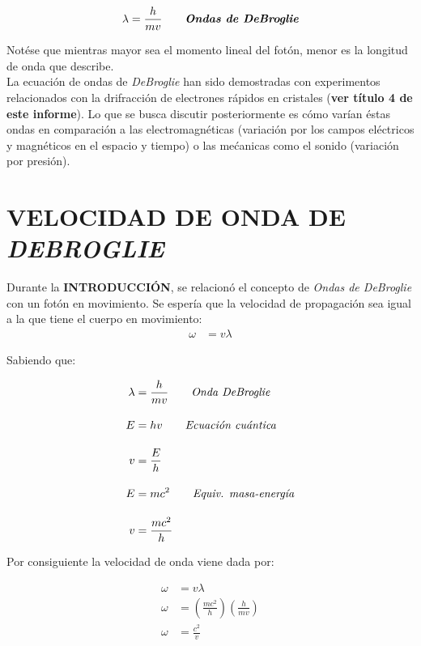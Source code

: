 \documentclass[a4paper]{article}
\begin{document}
        \begin{equation}
        \lambda = \frac {h} {mv} \tag*{\textit{\textbf{Ondas de DeBroglie}}} \\
        \end{equation}

        \indent Notése que mientras mayor sea el momento lineal del fotón, menor es la longitud de onda que describe. \\
        \indent La ecuación de ondas de \textit{DeBroglie} han sido demostradas con experimentos relacionados con la drifracción de electrones rápidos en cristales (\textbf{ver título 4 de este informe}). Lo que se busca discutir posteriormente es cómo varían éstas ondas en comparación a las electromagnéticas (variación por los campos eléctricos y magnéticos en el espacio y tiempo) o las mećanicas como el sonido (variación por presión). \\ 

\section{VELOCIDAD DE ONDA DE \textit{DEBROGLIE}}

    \indent Durante la \textbf{INTRODUCCIÓN}, se relacionó el concepto de \textit{Ondas de DeBroglie} con un fotón en movimiento. Se espería que la velocidad de propagación sea igual a la que tiene el cuerpo en movimiento: \\

    \begin{align}
        \omega &= v \lambda \tag*{Siendo $\omega$ la velocidad de la onda.} 
    \end{align}

    \indent Sabiendo que: 

    \begin{align}
        \lambda &= \frac {h} {mv} \tag*{\textit{Onda DeBroglie}} \\[10pt]
        E &= h v \tag*{\textit{Ecuación cuántica}} \\[10pt]
        v &= \frac {E} {h} \tag*{} \\[10pt]
        E &= mc^2 \tag*{\textit{Equiv. masa-energía}} \\[10pt]
        v &= \frac {mc^2} {h} \tag*{} 
    \end{align}

    \indent Por consiguiente la velocidad de onda viene dada por:

    \begin{align}
        \omega &= v \lambda \tag*{} \\[10pt]
        \omega &= (\frac {m c^2} {h}) (\frac {h} {mv}) \tag*{} \\[10pt]
        \omega &= \frac {c^2} {v} \tag*{}
    \end{align}
       
\end{document}
